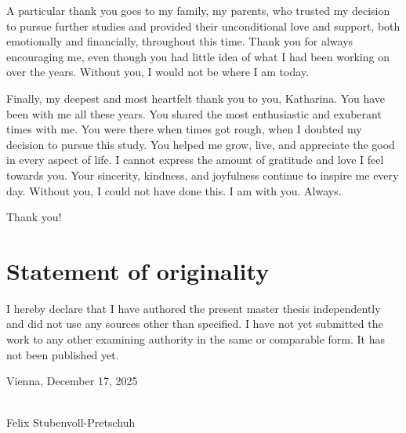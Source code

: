 \documentclass[
    a4paper,
    11pt,
    bibliography=totoc,
    listof=totoc,      
    headinclude=true,
    cleardoublepage=empty,
]{scrbook}
\theoremstyle{plain}
\theoremstyle{definition}
\theoremstyle{remark}
\begin{document}
A particular thank you goes to my family, my parents, who trusted my decision to pursue further studies and provided their unconditional love and support, both emotionally and financially, throughout this time. Thank you for always encouraging me, even though you had little idea of what I had been working on over the years. Without you, I would not be where I am today.

Finally, my deepest and most heartfelt thank you to you, Katharina. You have been with me all these years. You shared the most enthusiastic and exuberant times with me. You were there when times got rough, when I doubted my decision to pursue this study. You helped me grow, live, and appreciate the good in every aspect of life. I cannot express the amount of gratitude and love I feel towards you. Your sincerity, kindness, and joyfulness continue to inspire me every day. Without you, I could not have done this. I am with you. Always.

Thank you!
    
\clearpage


\chapter*{Statement of originality}

\vspace*{2cm}

I hereby declare that I have authored the present master thesis independently and did not use any sources other than specified. I have not yet submitted the work to any other examining authority in the same or comparable form. It has not been published yet.

\vspace*{3cm}


\noindent
Vienna, December 17, 2025 %
%
\hfill 
%
\begin{minipage}[t]{5cm}
\centering
\underline{\hspace*{5cm}}\\
\small Felix Stubenvoll-Pretschuh
\end{minipage}

\cleardoublepage


\end{document}
